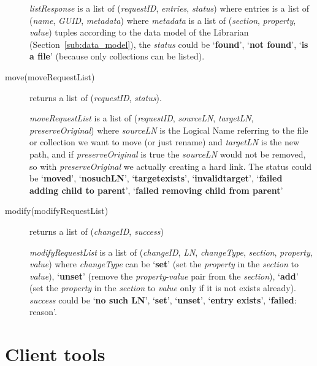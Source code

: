 \documentclass{book}
\begin{document}
\begin{description}
    \emph{listResponse} is a list of (\emph{requestID}, \emph{entries}, \emph{status}) where entries is a list of (\emph{name}, \emph{GUID}, \emph{metadata}) where \emph{metadata} is a list of (\emph{section}, \emph{property}, \emph{value}) tuples according to the data model of the Librarian (Section~\ref{sub:data_model}), the \emph{status} could be `\textbf{found}', `\textbf{not found}', `\textbf{is a file}' (because only collections can be listed).
    
    \item[move(moveRequestList)] returns a list of (\emph{requestID}, \emph{status}).
    
    \emph{moveRequestList} is a list of (\emph{requestID}, \emph{sourceLN}, \emph{targetLN}, \emph{preserveOriginal}) where \emph{sourceLN} is the Logical Name referring to the file or collection we want to move (or just rename) and \emph{targetLN} is the new path, and if \emph{preserveOriginal} is true the \emph{sourceLN} would not be removed, so with \emph{preserveOriginal} we actually creating a hard link. The status could be `\textbf{moved}', `\textbf{nosuchLN}', `\textbf{targetexists}', `\textbf{invalidtarget}', `\textbf{failed adding child to parent}', `\textbf{failed removing child from parent}'
    
    \item[modify(modifyRequestList)] returns a list of (\emph{changeID}, \emph{success})

    \emph{modifyRequestList} is a list of (\emph{changeID}, \emph{LN}, \emph{changeType}, \emph{section}, \emph{property}, \emph{value}) where \emph{changeType} can be `\textbf{set}' (set the \emph{property} in the \emph{section} to \emph{value}), `\textbf{unset}' (remove the \emph{property}-\emph{value} pair from the \emph{section}), `\textbf{add}' (set the \emph{property} in the \emph{section} to \emph{value} only if it is not exists already). \emph{success} could be `\textbf{no such LN}', `\textbf{set}', `\textbf{unset}', `\textbf{entry exists}', `\textbf{failed}: reason'.
    
\end{description}


\newpage

\section{Client tools} %
\label{sec:client_tools}
\end{document}

